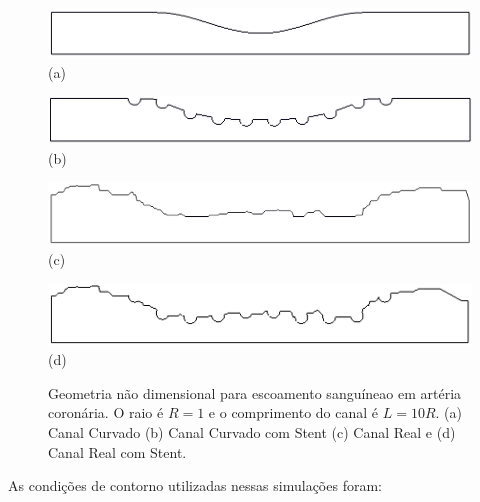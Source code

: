 \begin{figure}[H]
     \centering
     \begin{minipage}{.45\linewidth}
      \centering
      \includegraphics[scale=0.22]{./02_chaps/cap_solution/figure/Curved.png}\\
      (a)
     \end{minipage}%
     \begin{minipage}{.45\linewidth}
      \centering
      \includegraphics[scale=0.22]{./02_chaps/cap_solution/figure/CurvedStrut.png}\\
      (b)
     \end{minipage}
     \begin{minipage}{.45\linewidth}
      \centering
      \includegraphics[scale=0.16]{./02_chaps/cap_solution/figure/Real.png}\\
      (c)
     \end{minipage}%
     \begin{minipage}{.45\linewidth}
      \centering
      \includegraphics[scale=0.22]{./02_chaps/cap_solution/figure/RealStrut.png}\\
      (d)
     \end{minipage}
     \medskip
     \caption{Geometria não dimensional para escoamento sanguíneao em artéria coronária.
     O raio é $R=1$ e o comprimento do canal é $L=10R$.
     (a) Canal Curvado
     (b) Canal Curvado com Stent
     (c) Canal Real e
     (d) Canal Real com Stent.}
     \label{coronary artery geo}
\end{figure}

\newpage
\medskip
\noindent
As condições de contorno utilizadas nessas simulações foram:

